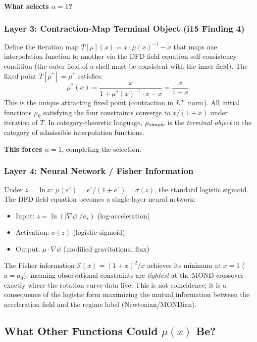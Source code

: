 \documentclass[11pt]{article}
\theoremstyle{definition}
\theoremstyle{remark}
\newcommand{\astar}{a_\star}
\begin{document}
\textbf{What selects $\alpha = 1$?}

\subsubsection{Layer 3: Contraction-Map Terminal Object (i15 Finding 4)}

Define the iteration map $T[\mu](x) = x \cdot \mu(x)^{-1} - x$
that maps one interpolation function to another via the DFD field
equation self-consistency condition (the outer field of a shell must
be consistent with the inner field). The fixed point $T[\mu^*] = \mu^*$
satisfies:
\[
\mu^*(x) = \frac{x}{1 + \mu^*(x)^{-1} \cdot x - x} = \frac{x}{1+x}.
\]
This is the unique attracting fixed point (contraction in $L^\infty$
norm). All initial functions $\mu_0$ satisfying the four constraints
converge to $x/(1+x)$ under iteration of $T$. In category-theoretic
language, $\mu_{\rm simple}$ is the \emph{terminal object} in the
category of admissible interpolation functions.

\textbf{This forces $\alpha = 1$}, completing the selection.

\subsubsection{Layer 4: Neural Network / Fisher Information}

Under $z = \ln x$: $\mu(e^z) = e^z/(1+e^z) = \sigma(z)$, the
standard logistic sigmoid. The DFD field equation becomes a
single-layer neural network:
\begin{itemize}
\item Input: $z = \ln(|\nabla\psi|/\astar)$ (log-acceleration)
\item Activation: $\sigma(z)$ (logistic sigmoid)
\item Output: $\mu \cdot \nabla\psi$ (modified gravitational flux)
\end{itemize}

The Fisher information $\mathcal{I}(x) = (1+x)^2/x$ achieves its
minimum at $x = 1$ ($a = a_0$), meaning observational constraints
are \emph{tightest} at the MOND crossover --- exactly where the
rotation curve data live. This is not coincidence; it is a consequence
of the logistic form maximizing the mutual information between the
acceleration field and the regime label (Newtonian/MONDian).

\subsection{What Other Functions Could $\mu(x)$ Be?}
\end{document}
